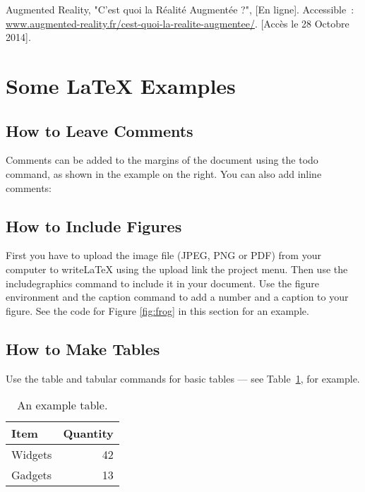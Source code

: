 \documentclass[a4paper]{article}
\begin{document}
\begin{thebibliography}{1}
	 Augmented Reality, "C'est quoi la Réalité Augmentée ?", [En ligne]. Accessible~: \url{www.augmented-reality.fr/cest-quoi-la-realite-augmentee/}. [Accès le 28 Octobre 2014].
\end{thebibliography}

\newpage

\section{Some \LaTeX{} Examples}
\label{sec:examples}

\subsection{How to Leave Comments}

Comments can be added to the margins of the document using the  todo command, as shown in the example on the right. You can also add inline comments:


\subsection{How to Include Figures}

First you have to upload the image file (JPEG, PNG or PDF) from your computer to writeLaTeX using the upload link the project menu. Then use the includegraphics command to include it in your document. Use the figure environment and the caption command to add a number and a caption to your figure. See the code for Figure \ref{fig:frog} in this section for an example.


\subsection{How to Make Tables}

Use the table and tabular commands for basic tables --- see Table~\ref{tab:widgets}, for example.

\begin{table}
\centering
\begin{tabular}{l|r}
Item & Quantity \\\hline
Widgets & 42 \\
Gadgets & 13
\end{tabular}
\caption{\label{tab:widgets}An example table.}
\end{table}
\end{document}
